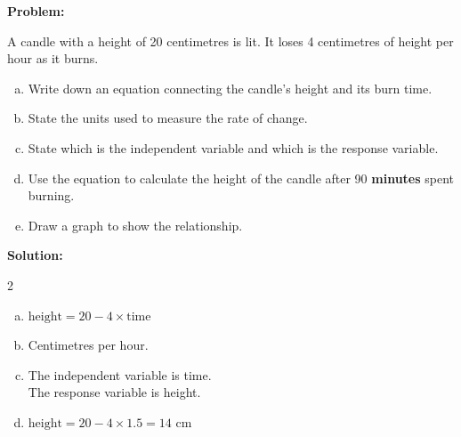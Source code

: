 \documentclass[
  11pt,
  openany]{book}
\begin{document}
\begin{tcolorbox}[title=Example,colback=RoyalBlue!1!,colframe=NavyBlue]
\textbf{Problem:}

A candle with a height of 20 centimetres is lit. It loses 4 centimetres of height per hour as it burns.

\begin{enumerate}[(a)]
    \item Write down an equation connecting the candle's height and its burn time.
    \item State the units used to measure the rate of change.
    \item State which is the independent variable and which is the response variable.
    \item Use the equation to calculate the height of the candle after 90 \textbf{minutes} spent burning.
    \item Draw a graph to show the relationship.
\end{enumerate}

\tcblower
\textbf{Solution:}

\begin{multicols}{2}

\begin{enumerate}[(a)]
    \item $\text{height}=\text{20}-\text{4}\times\text{time}$
    \item Centimetres per hour.
    \item The independent variable is time.\\The response variable is height.
    \item $\text{height}=\text{20}-\text{4}\times\text{1.5}=\text{14 cm}$
\end{enumerate}

\vfill\null
\columnbreak


\end{multicols}

\end{tcolorbox}
\end{document}
